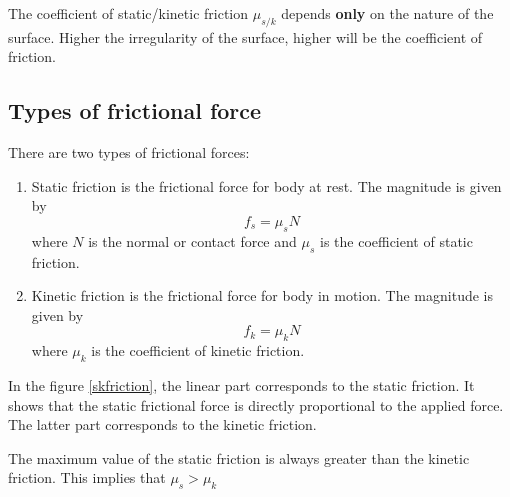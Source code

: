 \documentclass[10pt]{article}
\begin{document}
The coefficient of static/kinetic friction $\mu_{s/k}$ depends \textbf{only} on the nature of the surface.  Higher the irregularity of the surface, higher will be the coefficient of friction.

\subsection{Types of frictional force}
There are two types of frictional forces: 
\begin{enumerate}
\item Static friction is  the frictional force for body at rest.  The magnitude is given by
  \begin{equation}
    f_s=\mu_sN
  \end{equation}
where $N$ is the normal or contact force and $\mu_s$ is the coefficient of static friction.
\item Kinetic friction is the frictional force for body in motion. The magnitude is given by
  \begin{equation}
    f_k=\mu_kN
  \end{equation}
where $\mu_k$ is the coefficient of kinetic friction.
\end{enumerate}

In the figure \ref{skfriction}, the linear part corresponds to the static friction. It shows that the static frictional force is directly proportional to the applied force.  The latter part corresponds to the kinetic friction.

The maximum value of the static friction is always greater than the kinetic friction.  This implies that $\mu_s>\mu_k$
\end{document}
